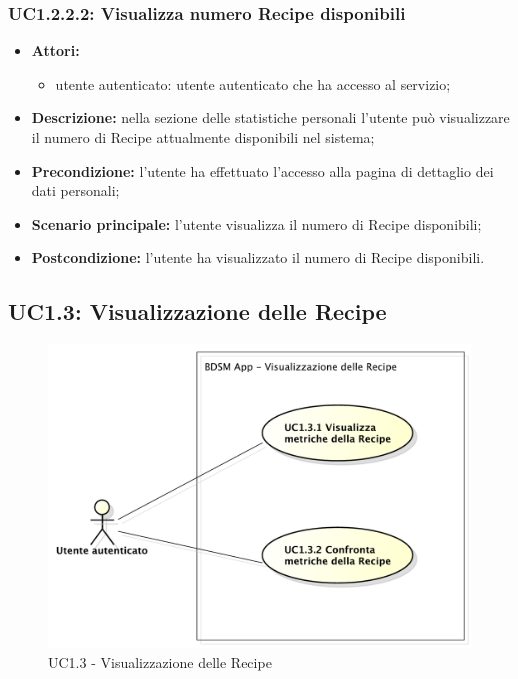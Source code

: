 \subsubsection{UC1.2.2.2: Visualizza numero Recipe disponibili}
\begin{itemize}
	\item \textbf{Attori:}
	\begin{itemize}
		\item utente autenticato: utente autenticato che ha accesso al servizio;
	\end{itemize}
	\item \textbf{Descrizione:} nella sezione delle statistiche personali l'utente può visualizzare il numero di Recipe attualmente disponibili nel sistema;
	\item \textbf{Precondizione:} l'utente ha effettuato l'accesso alla pagina di dettaglio dei dati personali;
	\item \textbf{Scenario principale:} l'utente visualizza il numero di Recipe disponibili;
	\item \textbf{Postcondizione:} l'utente ha visualizzato il numero di Recipe disponibili.
\end{itemize}

\pagebreak
\subsection{UC1.3: Visualizzazione delle Recipe}
\begin{figure}[!htbp]
	\centering
	\centerline{\includegraphics[scale=0.45]{./images/UC1_3.pdf}}
	\caption{UC1.3 - Visualizzazione delle Recipe}
\end{figure}

